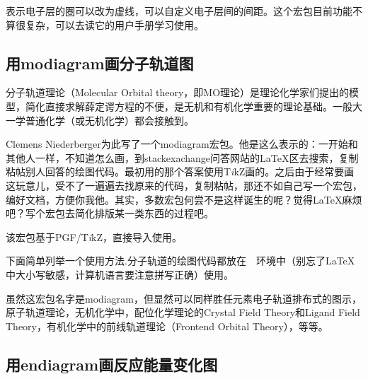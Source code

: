 \documentclass[a4paper,UTF8,zihao = -4]{ctexart} %
\providecommand{\tikzlg}{PGF/T\textit{i}kZ}
\newcommand{\tkznm}{T\textit{i}kZ}
\begin{document}
表示电子层的圈可以改为虚线，可以自定义电子层间的间距。这个宏包目前功能不算很复杂，可以去读它的用户手册学习使用。

\subsection{用\textsf{modiagram}画分子轨道图}
\label{sec:modiagram}

分子轨道理论（Molecular Orbital theory，即MO理论）是理论化学家们提出的模型，简化直接求解薛定谔方程的不便，是无机和有机化学重要的理论基础。一般大一学普通化学（或无机化学）都会接触到。

Clemens Niederberger为此写了一个\textsf{modiagram}宏包。他是这么表示的：一开始和其他人一样，不知道怎么画，到\textsf{stackexachange}问答网站的\LaTeX{}区去搜索，复制粘帖别人回答的绘图代码。最初用的那个答案使用\tkznm{}画的。之后由于经常要画这玩意儿，受不了一遍遍去找原来的代码，复制粘帖，那还不如自己写一个宏包，编好文档，方便你我他。其实，多数宏包何尝不是这样诞生的呢？觉得\LaTeX{}麻烦吧？写个宏包去简化排版某一类东西的过程吧。

该宏包基于\tikzlg{}，直接导入使用。

\begin{dispListing}
\usepackage{modiagram} %
\end{dispListing}

下面简单列举一个使用方法.分子轨道的绘图代码都放在~~环境中（别忘了\LaTeX{}中大小写敏感，计算机语言要注意拼写正确）使用。

\begin{dispExample}
\begin{MOdiagram}
\EnergyAxis[title = Energy]
\end{MOdiagram}
\end{dispExample}

虽然这宏包名字是\textsf{modiagram}，但显然可以同样胜任元素电子轨道排布式的图示，原子轨道理论，无机化学中，配位化学理论的Crystal Field Theory和Ligand Field Theory，有机化学中的前线轨道理论（Frontend Orbital Theory），等等。

\subsection{用\textsf{endiagram}画反应能量变化图}
\label{sec:energylevel}
\end{document}
